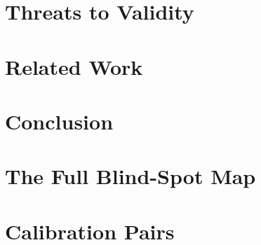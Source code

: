 \documentclass[sigconf,review,anonymous]{acmart}
\begin{document}
\section{Threats to Validity}


\section{Related Work}


\section{Conclusion}


\appendix
\section{The Full Blind-Spot Map}


\section{Calibration Pairs}




\end{document}
